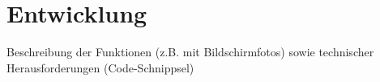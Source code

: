 
\chapter{Entwicklung}
Beschreibung der Funktionen (z.B. mit Bildschirmfotos) sowie technischer Herausforderungen (Code-Schnippsel)
